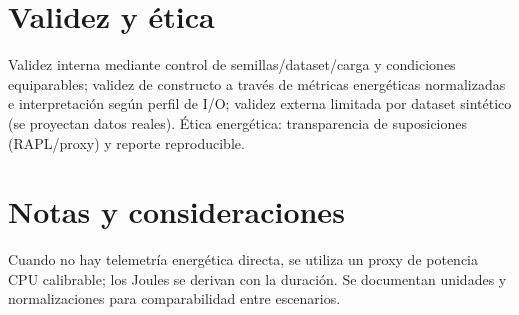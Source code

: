 \section{Validez y ética}
Validez interna mediante control de semillas/dataset/carga y condiciones equiparables; validez de constructo a través de métricas energéticas normalizadas e interpretación según perfil de I/O; validez externa limitada por dataset sintético (se proyectan datos reales). Ética energética: transparencia de suposiciones (RAPL/proxy) y reporte reproducible.

\section{Notas y consideraciones}
Cuando no hay telemetría energética directa, se utiliza un proxy de potencia CPU calibrable; los Joules se derivan con la duración. Se documentan unidades y normalizaciones para comparabilidad entre escenarios.

